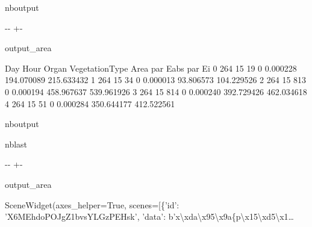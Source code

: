 \documentclass[letterpaper,10pt,english]{sphinxmanual}
\begin{document}
\begin{sphinxuseclass}{nboutput}
{

\kern-\sphinxverbatimsmallskipamount\kern-\baselineskip
\kern+\FrameHeightAdjust\kern-\fboxrule
\vspace{\nbsphinxcodecellspacing}

\begin{sphinxuseclass}{output_area}
\begin{sphinxuseclass}{}


\begin{sphinxVerbatim}[commandchars=\\\{\}]
   Day  Hour  Organ  VegetationType      Area    par Eabs      par Ei
0  264    15     19               0  0.000228  194.070089  215.633432
1  264    15     34               0  0.000013   93.806573  104.229526
2  264    15    813               0  0.000194  458.967637  539.961926
3  264    15    814               0  0.000240  392.729426  462.034618
4  264    15     51               0  0.000284  350.644177  412.522561
\end{sphinxVerbatim}



\end{sphinxuseclass}
\end{sphinxuseclass}
}

\end{sphinxuseclass}
\begin{sphinxuseclass}{nboutput}
\begin{sphinxuseclass}{nblast}
{

\kern-\sphinxverbatimsmallskipamount\kern-\baselineskip
\kern+\FrameHeightAdjust\kern-\fboxrule
\vspace{\nbsphinxcodecellspacing}

\begin{sphinxuseclass}{output_area}
\begin{sphinxuseclass}{}


\begin{sphinxVerbatim}[commandchars=\\\{\}]
\llap{\color{nbsphinxout}[32]:\,\hspace{\fboxrule}\hspace{\fboxsep}}SceneWidget(axes\_helper=True, scenes=[\{'id': 'X6MEhdoPOJgZ1bvsYLGzPEHsk', 'data': b'x\textbackslash{}xda\textbackslash{}x95\textbackslash{}x9a\{p\textbackslash{}x15\textbackslash{}xd5\textbackslash{}x1…
\end{sphinxVerbatim}



\end{sphinxuseclass}
\end{sphinxuseclass}
}

\end{sphinxuseclass}
\end{sphinxuseclass}
\end{document}
